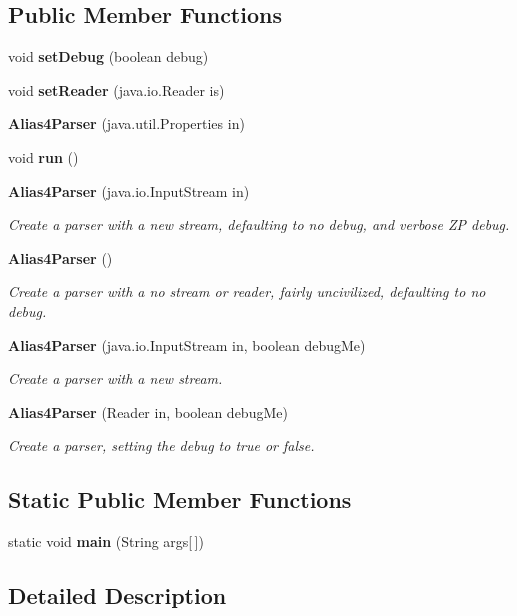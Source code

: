 \subsection*{Public Member Functions}
\begin{DoxyCompactItemize}
\item 
void {\bf set\+Debug} (boolean debug)
\item 
void {\bf set\+Reader} (java.\+io.\+Reader is)
\item 
{\bf Alias4\+Parser} (java.\+util.\+Properties in)
\item 
void {\bf run} ()
\item 
{\bf Alias4\+Parser} (java.\+io.\+Input\+Stream in)
\begin{DoxyCompactList}\small\item\em Create a parser with a new stream, defaulting to no debug, and verbose Z\+P debug. \end{DoxyCompactList}\item 
{\bf Alias4\+Parser} ()
\begin{DoxyCompactList}\small\item\em Create a parser with a no stream or reader, fairly uncivilized, defaulting to no debug. \end{DoxyCompactList}\item 
{\bf Alias4\+Parser} (java.\+io.\+Input\+Stream in, boolean debug\+Me)
\begin{DoxyCompactList}\small\item\em Create a parser with a new stream. \end{DoxyCompactList}\item 
{\bf Alias4\+Parser} (Reader in, boolean debug\+Me)
\begin{DoxyCompactList}\small\item\em Create a parser, setting the debug to true or false. \end{DoxyCompactList}\end{DoxyCompactItemize}
\subsection*{Static Public Member Functions}
\begin{DoxyCompactItemize}
\item 
static void {\bf main} (String args[$\,$])
\end{DoxyCompactItemize}


\subsection{Detailed Description}


